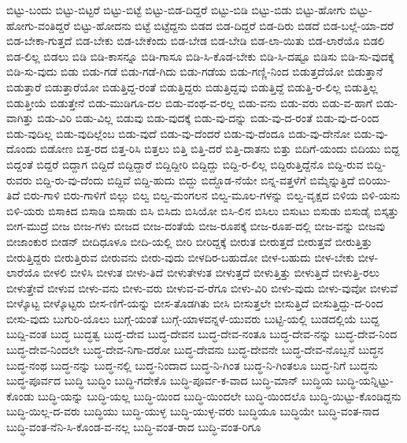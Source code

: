 {ಬಿಟ್ಟು-ಬಂದು
ಬಿಟ್ಟು-ಬಿಟ್ಟರೆ
ಬಿಟ್ಟು-ಬಿಟ್ಟೆ
ಬಿಟ್ಟು-ಬಿಡ-ದಿದ್ದರೆ
ಬಿಟ್ಟು-ಬಿಡಿ
ಬಿಟ್ಟು-ಬಿಡು
ಬಿಟ್ಟು-ಹೋಗು
ಬಿಟ್ಟು-ಹೋಗು-ವಂತಿದ್ದರೆ
ಬಿಟ್ಟು-ಹೋದನು
ಬಿಟ್ಟೆ
ಬಿಟ್ಟೆದ್ದನು
ಬಿಡದ
ಬಿಡ-ದಿದ್ದರೆ
ಬಿಡ-ದಿರು
ಬಿಡದೆ
ಬಿಡ-ಬಲ್ಲೆ-ಯಾ-ದರೆ
ಬಿಡ-ಬೇಕಾ-ಗುತ್ತದೆ
ಬಿಡ-ಬೇಕು
ಬಿಡ-ಬೇಕೆಂದು
ಬಿಡ-ಬೇಡ
ಬಿಡ-ಬೇಡಿ
ಬಿಡ-ಲಾ-ಯಿತು
ಬಿಡ-ಲಾರೆಯೊ
ಬಿಡಲಿ
ಬಿಡ-ಲಿಲ್ಲ
ಬಿಡಲು
ಬಿಡಿ
ಬಿಡಿ-ಕಾಸನ್ನೂ
ಬಿಡಿ-ಗಾಸೂ
ಬಿಡಿ-ಸಿ-ಕೊಡ-ಬೇಕು
ಬಿಡಿ-ಸಿ-ದಷ್ಟೂ
ಬಿಡಿಸು
ಬಿಡಿ-ಸು-ವುದಕ್ಕೆ
ಬಿಡಿ-ಸು-ವುದು
ಬಿಡು
ಬಿಡು-ಗಡೆ
ಬಿಡು-ಗಡೆ-ಗಿದು
ಬಿಡು-ಗಡೆಯ
ಬಿಡು-ಗಣ್ಣಿ-ನಿಂದ
ಬಿಡುತ್ತದೆಯೋ
ಬಿಡುತ್ತಾನೆ
ಬಿಡುತ್ತಾರೆ
ಬಿಡುತ್ತಾರೆಯೋ
ಬಿಡುತ್ತಿದ್ದ-ರಂತೆ
ಬಿಡುತ್ತಿದ್ದರು
ಬಿಡುತ್ತಿದ್ದವು
ಬಿಡುತ್ತಿದ್ದೆ
ಬಿಡುತ್ತಿ-ರ-ಲಿಲ್ಲ
ಬಿಡುತ್ತಿಲ್ಲ
ಬಿಡುತ್ತೀಯೆ
ಬಿಡುತ್ತೇನೆ
ಬಿಡು-ಮುಡಿಗೂ-ದಲ
ಬಿಡು-ವಂಥ-ವ-ರಲ್ಲ
ಬಿಡು-ವನು
ಬಿಡು-ವರು
ಬಿಡು-ವ-ಹಾಗೆ
ಬಿಡು-ವಾಗಿತ್ತು
ಬಿಡು-ವಿರಿ
ಬಿಡು-ವಿಲ್ಲ
ಬಿಡುವು
ಬಿಡು-ವುದಕ್ಕೆ
ಬಿಡು-ವು-ದನ್ನು
ಬಿಡು-ವು-ದ-ರಂತೆ
ಬಿಡು-ವು-ದ-ರಿಂದ
ಬಿಡು-ವುದಿಲ್ಲ
ಬಿಡು-ವುದಿಲ್ಲೆಂಬ
ಬಿಡು-ವುದೆ
ಬಿಡು-ವು-ದೆಂದರೆ
ಬಿಡು-ವು-ದೆಂದೂ
ಬಿಡು-ವು-ದೇನೋ
ಬಿಡು-ವು-ದೊಂದು
ಬಿಡೋಣ
ಬಿತ್ತ-ರದ
ಬಿತ್ತ-ರಿಸಿ
ಬಿತ್ತಲು
ಬಿತ್ತಿ
ಬಿತ್ತಿ-ದರೆ
ಬಿತ್ತಿ-ದಾತನು
ಬಿತ್ತು
ಬಿದಿಗೆ-ಯಂದು
ಬಿದಿಯು
ಬಿದ್ದ
ಬಿದ್ದಂತೆ
ಬಿದ್ದರೆ
ಬಿದ್ದಾಗ
ಬಿದ್ದಿದೆ
ಬಿದ್ದಿದ್ದಾರೆ
ಬಿದ್ದಿದ್ದೀರಿ
ಬಿದ್ದಿದ್ದು
ಬಿದ್ದಿ-ರ-ಲಿಲ್ಲ
ಬಿದ್ದಿರುತ್ತಿದ್ದೆನೊ
ಬಿದ್ದಿ-ರುವ
ಬಿದ್ದಿ-ರುವರು
ಬಿದ್ದಿ-ರು-ವು-ದೆಂದು
ಬಿದ್ದಿವೆ
ಬಿದ್ದಿ-ಹುದು
ಬಿದ್ದು
ಬಿದ್ದೊಡ-ನೆಯೇ
ಬಿನ್ನ-ವತ್ತಳೆಗೆ
ಬಿಮ್ಮೆನ್ನುತ್ತಿದೆ
ಬಿರಿಯು-ತಿದೆ
ಬಿರು-ಗಾಳಿ
ಬಿರು-ಗಾಳಿಗೆ
ಬಿಲ್ಲು
ಬಿಲ್ವ
ಬಿಲ್ವ-ಮಂಗಲನ
ಬಿಲ್ವ-ಮೂಲ-ಗಳನ್ನು
ಬಿಲ್ವ-ವೃಕ್ಷದ
ಬಿಳಿಯ
ಬಿಳಿ-ಯನು
ಬಿಳಿ-ಯರು
ಬಿಸಾಕಿದ
ಬಿಸಾಡಿ
ಬಿಸಾಡು
ಬಿಸಿ
ಬಿಸಿದು
ಬಿಸಿಯೋ
ಬಿಸಿ-ಲಿನ
ಬಿಸಿಲು
ಬಿಸುಟು
ಬಿಸುಡು
ಬಿಸುಡೈ
ಬಿಸ್ಕತ್ತು
ಬೀಗ-ಮುದ್ರೆ
ಬೀಜ
ಬೀಜ-ಗಳು
ಬೀಜದ
ಬೀಜ-ದಂತೆಯೆ
ಬೀಜ-ರೂಪಕ್ಕೆ
ಬೀಜ-ರೂಪ-ದಲ್ಲಿ
ಬೀಜ-ವನ್ನು
ಬೀಜವು
ಬೀಜಾಂಕುರ
ಬೀಡನ್
ಬೀದಿಧೂಳೂ
ಬೀದಿ-ಯಲ್ಲಿ
ಬೀರಿ
ಬೀರಿದ್ದಕ್ಕೆ
ಬೀರುತ
ಬೀರುತ್ತದೆ
ಬೀರುತ್ತವೆ
ಬೀರುತ್ತಿತ್ತು
ಬೀರುತ್ತಿದ್ದರು
ಬೀರುತ್ತಿರುವ
ಬೀರುವನು
ಬೀರು-ವುದು
ಬೀಳದಿರ-ಬಹುದೋ
ಬೀಳ-ಬಹುದು
ಬೀಳ-ಬೇಕು
ಬೀಳ-ಲಾರೆಯೊ
ಬೀಳಲಿ
ಬೀಳಿಸಿ
ಬೀಳುತ
ಬೀಳು-ತಿದೆ
ಬೀಳುತೇಳುತ
ಬೀಳುತ್ತದೆ
ಬೀಳುತ್ತಿತ್ತು
ಬೀಳುತ್ತಿದೆ
ಬೀಳುತ್ತಿ-ರಲು
ಬೀಳುತ್ತೇವೆ
ಬೀಳುವ
ಬೀಳು-ವನು
ಬೀಳು-ವರು
ಬೀಳುವ-ವ-ರೆಗೂ
ಬೀಳು-ವಿರಿ
ಬೀಳು-ವುದು
ಬೀಳು-ವುವೋ
ಬೀಳುವೆ
ಬೀಳ್ಕೊಟ್ಟ
ಬೀಳ್ಕೊಟ್ಟರು
ಬೀಸ-ಣಿಗೆ-ಯನ್ನು
ಬೀಸ-ತೊಡಗಿತು
ಬೀಸಿ
ಬೀಸುತ್ತಲೇ
ಬೀಸುತ್ತಿದೆ
ಬೀಸುತ್ತಿದ್ದು-ದ-ರಿಂದ
ಬೀಸು-ವುದು
ಬುಗುರಿ-ಯೊಲು
ಬುಗ್ಗೆ-ಯಂತೆ
ಬುಗ್ಗೆ-ಯಾಳವನ್ನಳೆ-ಯುವರು
ಬುಟ್ಟಿ-ಯಲ್ಲಿ
ಬುಡದಲ್ಲಿಯೆ
ಬುದ್ದ
ಬುದ್ದಿ-ವಂತ
ಬುದ್ಧ
ಬುದ್ಧತ್ವ
ಬುದ್ಧ-ದೇವ
ಬುದ್ಧ-ದೇವನ
ಬುದ್ಧ-ದೇವ-ನಂತೂ
ಬುದ್ಧ-ದೇವ-ನನ್ನು
ಬುದ್ಧ-ದೇವ-ನಿಂದ
ಬುದ್ಧ-ದೇವ-ನಿಂದಲೇ
ಬುದ್ಧ-ದೇವ-ನಿಗಾ-ದರೋ
ಬುದ್ಧ-ದೇವನು
ಬುದ್ಧ-ದೇವನೇ
ಬುದ್ಧ-ದೇವ-ನೊಬ್ಬನೆ
ಬುದ್ಧನ
ಬುದ್ಧ-ನಂಥ
ಬುದ್ಧ-ನನ್ನು
ಬುದ್ಧ-ನಲ್ಲಿ
ಬುದ್ಧ-ನಿಂದಾದ
ಬುದ್ಧ-ನಿ-ಗಿಂತ
ಬುದ್ಧ-ನಿ-ಗಿಂತಲೂ
ಬುದ್ಧ-ನಿಗೆ
ಬುದ್ಧನು
ಬುದ್ಧ-ಪೂರ್ವದ
ಬುದ್ಧಿ
ಬುದ್ಧಿಂ
ಬುದ್ಧಿ-ಗದೇಕೊ
ಬುದ್ಧಿ-ಪೂರ್ವ-ಕ-ವಾದ
ಬುದ್ಧಿ-ಮಾನ್
ಬುದ್ಧಿಯ
ಬುದ್ಧಿ-ಯನ್ನಿಟ್ಟು-ಕೊಂಡು
ಬುದ್ಧಿ-ಯನ್ನು
ಬುದ್ಧಿ-ಯಲ್ಲ
ಬುದ್ಧಿ-ಯಿಂದ
ಬುದ್ಧಿ-ಯಿಂದಲೇ
ಬುದ್ಧಿ-ಯಿಂದಲೊ
ಬುದ್ಧಿ-ಯಿಟ್ಟು-ಕೊಂಡಿದ್ದನು
ಬುದ್ಧಿ-ಯಿಲ್ಲ-ದ-ವರು
ಬುದ್ಧಿಯು
ಬುದ್ಧಿ-ಯುಳ್ಳ
ಬುದ್ಧಿ-ಯುಳ್ಳ-ವರು
ಬುದ್ಧಿಯೂ
ಬುದ್ಧಿಯೇ
ಬುದ್ಧಿ-ವಂತ-ನಾದ
ಬುದ್ಧಿ-ವಂತ-ನೆನಿ-ಸಿ-ಕೊಂಡ-ವ-ನಲ್ಲ
ಬುದ್ಧಿ-ವಂತ-ರಾದ
ಬುದ್ಧಿ-ವಂತ-ರಿಗೂ
}
